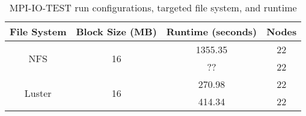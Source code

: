 \begin{table}[]
	\centering
	\begin{tabular}{|c|c|c|c|}
		\hline
		File System	& Block Size (MB)	& Runtime (seconds) &	Nodes \\ \hline
		\multirow{2}{*}{NFS}	& \multirow{2}{*}{16}	& 1355.35 &	22\\ \cline{3-4} 
		& 	& ?? &	22\\ \hline
		\multirow{2}{*}{Luster}	& \multirow{2}{*}{16}	&  270.98 & 22 \\ \cline{3-4} 
		& 	&  414.34 &	22 \\ \hline
	\end{tabular}
	\renewcommand{\arraystretch}{1}
	\caption{MPI-IO-TEST run configurations, targeted file system, and runtime}
	\label{table:mpi-io-test}
\end{table}



